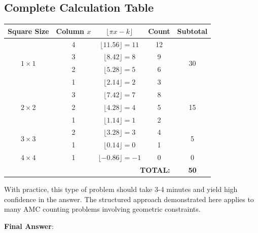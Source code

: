 \documentclass[12pt]{article}
\begin{document}
\subsection*{Complete Calculation Table}

\begin{center}
\begin{tabular}{|c|c|c|c|c|}
\hline
\textbf{Square Size} & \textbf{Column $x$} & \textbf{$\lfloor \pi x - k \rfloor$} & \textbf{Count} & \textbf{Subtotal} \\
\hline
\multirow{4}{*}{$1 \times 1$} & 4 & $\lfloor 11.56 \rfloor = 11$ & 12 & \multirow{4}{*}{30} \\
& 3 & $\lfloor 8.42 \rfloor = 8$ & 9 & \\
& 2 & $\lfloor 5.28 \rfloor = 5$ & 6 & \\
& 1 & $\lfloor 2.14 \rfloor = 2$ & 3 & \\
\hline
\multirow{3}{*}{$2 \times 2$} & 3 & $\lfloor 7.42 \rfloor = 7$ & 8 & \multirow{3}{*}{15} \\
& 2 & $\lfloor 4.28 \rfloor = 4$ & 5 & \\
& 1 & $\lfloor 1.14 \rfloor = 1$ & 2 & \\
\hline
\multirow{2}{*}{$3 \times 3$} & 2 & $\lfloor 3.28 \rfloor = 3$ & 4 & \multirow{2}{*}{5} \\
& 1 & $\lfloor 0.14 \rfloor = 0$ & 1 & \\
\hline
$4 \times 4$ & 1 & $\lfloor -0.86 \rfloor = -1$ & 0 & 0 \\
\hline
\multicolumn{4}{|r|}{\textbf{TOTAL:}} & \textbf{50} \\
\hline
\end{tabular}
\end{center}

With practice, this type of problem should take 3-4 minutes and yield high confidence in the answer. The structured approach demonstrated here applies to many AMC counting problems involving geometric constraints.

\textbf{Final Answer}: 
\end{document}
